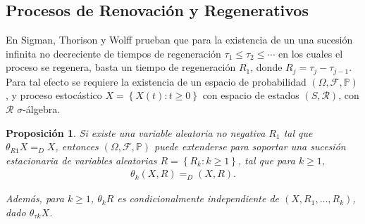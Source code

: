 \documentclass{article}
\newtheorem{Prop}{Proposición}[section]
\newcommand{\prob}{\mathbb{P}}
\numberwithin{equation}{section}
\begin{document}
\subsection{Procesos de Renovaci\'on y Regenerativos}




En Sigman, Thorison y Wolff \cite{Sigman2} prueban que para la existencia de un una sucesi\'on infinita no decreciente de tiempos de regeneraci\'on $\tau_{1}\leq\tau_{2}\leq\cdots$ en los cuales el proceso se regenera, basta un tiempo de regeneraci\'on $R_{1}$, donde $R_{j}=\tau_{j}-\tau_{j-1}$. Para tal efecto se requiere la existencia de un espacio de probabilidad $\left(\Omega,\mathcal{F},\prob\right)$, y proceso estoc\'astico $\textit{X}=\left\{X\left(t\right):t\geq0\right\}$ con espacio de estados $\left(S,\mathcal{R}\right)$, con $\mathcal{R}$ $\sigma$-\'algebra.

\begin{Prop}
Si existe una variable aleatoria no negativa $R_{1}$ tal que $\theta_{R1}X=_{D}X$, entonces $\left(\Omega,\mathcal{F},\prob\right)$ puede extenderse para soportar una sucesi\'on estacionaria de variables aleatorias $R=\left\{R_{k}:k\geq1\right\}$, tal que para $k\geq1$,
\begin{eqnarray*}
\theta_{k}\left(X,R\right)=_{D}\left(X,R\right).
\end{eqnarray*}

Adem\'as, para $k\geq1$, $\theta_{k}R$ es condicionalmente independiente de $\left(X,R_{1},\ldots,R_{k}\right)$, dado $\theta_{\tau k}X$.

\end{Prop}
\end{document}
